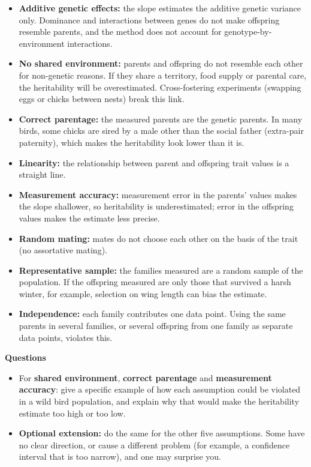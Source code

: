 \documentclass[
  a4paper]{book}
\providecommand{\tightlist}{%
  \setlength{\itemsep}{0pt}\setlength{\parskip}{0pt}}
\begin{document}
\begin{itemize}
\tightlist
\item
  \textbf{Additive genetic effects:} the slope estimates the additive genetic variance only. Dominance and interactions between genes do not make offspring resemble parents, and the method does not account for genotype-by-environment interactions.
\item
  \textbf{No shared environment:} parents and offspring do not resemble each other for non-genetic reasons. If they share a territory, food supply or parental care, the heritability will be overestimated. Cross-fostering experiments (swapping eggs or chicks between nests) break this link.
\item
  \textbf{Correct parentage:} the measured parents are the genetic parents. In many birds, some chicks are sired by a male other than the social father (extra-pair paternity), which makes the heritability look lower than it is.
\item
  \textbf{Linearity:} the relationship between parent and offspring trait values is a straight line.
\item
  \textbf{Measurement accuracy:} measurement error in the parents' values makes the slope shallower, so heritability is underestimated; error in the offspring values makes the estimate less precise.
\item
  \textbf{Random mating:} mates do not choose each other on the basis of the trait (no assortative mating).
\item
  \textbf{Representative sample:} the families measured are a random sample of the population. If the offspring measured are only those that survived a harsh winter, for example, selection on wing length can bias the estimate.
\item
  \textbf{Independence:} each family contributes one data point. Using the same parents in several families, or several offspring from one family as separate data points, violates this.
\end{itemize}

\textbf{Questions}

\begin{itemize}
\tightlist
\item
  For \textbf{shared environment}, \textbf{correct parentage} and \textbf{measurement accuracy}: give a specific example of how each assumption could be violated in a wild bird population, and explain why that would make the heritability estimate too high or too low.
\item
  \textbf{Optional extension:} do the same for the other five assumptions. Some have no clear direction, or cause a different problem (for example, a confidence interval that is too narrow), and one may surprise you.
\end{itemize}
\end{document}
